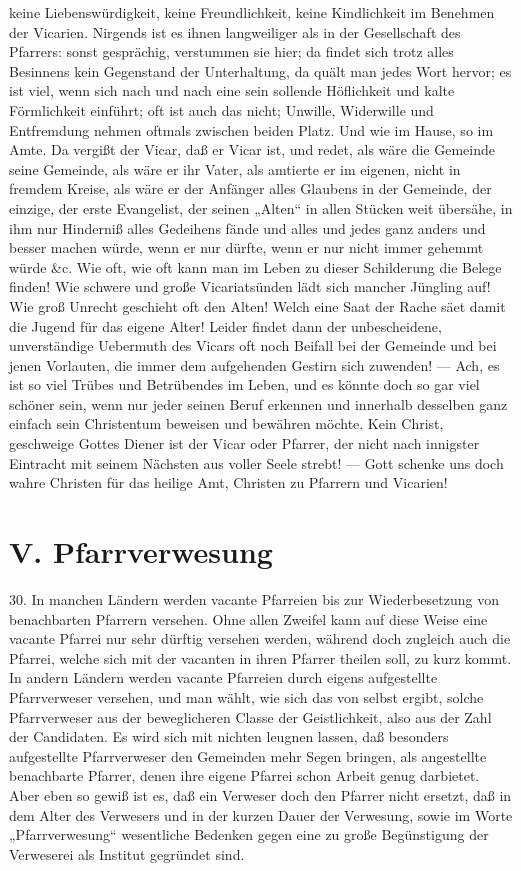 keine Liebenswürdigkeit, keine Freundlichkeit, keine Kindlichkeit im Benehmen der Vicarien. Nirgends ist es ihnen langweiliger als in der Gesellschaft des Pfarrers: sonst gesprächig, verstummen sie hier; da findet sich trotz alles Besinnens kein Gegenstand der Unterhaltung, da quält man jedes Wort hervor; es ist viel, wenn sich nach und nach eine sein sollende Höflichkeit und kalte Förmlichkeit einführt; oft ist auch das nicht; Unwille, Widerwille und Entfremdung nehmen oftmals zwischen beiden Platz. Und wie im Hause, so im Amte. Da vergißt der Vicar, daß er Vicar ist, und redet, als wäre die Gemeinde seine Gemeinde, als wäre er ihr Vater, als amtierte er im eigenen, nicht in fremdem Kreise, als wäre er der Anfänger alles Glaubens in der Gemeinde, der einzige, der erste Evangelist, der seinen „Alten“ in allen Stücken weit übersähe, in ihm nur Hinderniß alles Gedeihens fände und alles und jedes ganz anders und besser machen würde, wenn er nur dürfte, wenn er nur nicht immer gehemmt würde \&c. Wie oft, wie oft kann man im Leben zu dieser Schilderung die Belege finden! Wie schwere und große Vicariatsünden lädt sich mancher Jüngling auf! Wie groß Unrecht geschieht oft den Alten! Welch eine Saat der Rache säet damit die Jugend für das eigene Alter! Leider findet dann der unbescheidene, unverständige Uebermuth des Vicars oft noch Beifall bei der Gemeinde und bei jenen Vorlauten, die immer dem aufgehenden Gestirn sich zuwenden! — Ach, es ist so viel Trübes und Betrübendes im Leben, und es könnte doch so gar viel schöner sein, wenn nur jeder seinen Beruf erkennen und innerhalb desselben
ganz einfach sein Christentum beweisen und bewähren möchte. Kein Christ, geschweige Gottes Diener ist der Vicar oder Pfarrer, der nicht nach innigster Eintracht mit seinem Nächsten aus voller Seele strebt! — Gott schenke uns doch wahre Christen für das heilige Amt, Christen zu Pfarrern und Vicarien!

\section{V. Pfarrverwesung}

30. In manchen Ländern werden vacante Pfarreien bis zur Wiederbesetzung von benachbarten Pfarrern versehen. Ohne allen Zweifel kann auf diese Weise eine vacante Pfarrei nur sehr dürftig versehen werden, während doch zugleich auch die Pfarrei, welche sich mit der vacanten in ihren Pfarrer theilen soll, zu kurz kommt. In andern Ländern werden vacante Pfarreien durch eigens aufgestellte Pfarrverweser versehen, und man wählt, wie sich das von selbst ergibt, solche Pfarrverweser aus der beweglicheren Classe der Geistlichkeit, also aus der Zahl der Candidaten. Es wird sich mit nichten leugnen lassen, daß besonders aufgestellte Pfarrverweser den Gemeinden mehr Segen bringen, als angestellte benachbarte Pfarrer, denen ihre eigene Pfarrei schon Arbeit genug darbietet. Aber eben so gewiß ist es, daß ein Verweser doch den Pfarrer nicht ersetzt, daß in dem Alter des Verwesers und in der kurzen Dauer der Verwesung, sowie im Worte „Pfarrverwesung“ wesentliche Bedenken gegen eine zu große Begünstigung der Verweserei als Institut gegründet sind.

